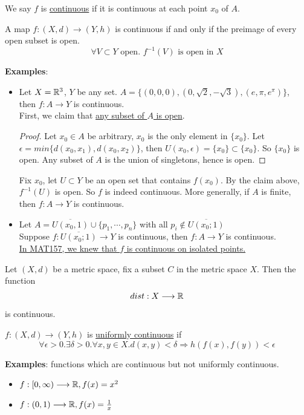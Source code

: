 \begin{definition}
    We say $f$ is \underline{continuous} if it is continuous at each point $x_0$ of $A$.
\end{definition}

\begin{theorem}
    A map $f:(X,d) \longrightarrow (Y,h)$ is continuous if and only if the preimage of every open subset is open.
    $$\forall V \subset Y \text{ open. } f^{-1}(V) \text{ is open in }X$$
\end{theorem}


\noindent \textbf{Examples}:
\begin{itemize}
    \item Let $X=\mathbb{R}^3$, $Y$ be any set. $A=\{(0,0,0),(0,\sqrt{2},-\sqrt{3}),(e,\pi,e^{\pi})\}$,\\ then $f:A \longrightarrow Y$ is continuous.\\
    First, we claim that \underline{any subset of $A$ is open}.
    \begin{proof}
        Let $x_0 \in A$ be arbitrary, $x_0$ is the only element in $\{x_0\}$. 
        Let $\epsilon=min\{d(x_0,x_1),d(x_0,x_2)\}$, then $U(x_0,\epsilon)=\{x_0\} \subset \{x_0\}$. 
        So $\{x_0\}$ is open. Any subset of $A$ is the union of singletons, hence is open.
    \end{proof}
    Fix $x_0$, let $U \subset Y$ be an open set that contains $f(x_0)$. 
    By the claim above, $f^{-1}(U)$ is open. So $f$ is indeed continuous. 
    More generally, if $A$ is finite, then $f:A \longrightarrow Y$ is continuous.
    \item Let $A=\overline{U(x_0,1)}\cup \{p_1,\cdots,p_n\}$ with all $p_i \notin \overline{U(x_0;1)}$\\
    Suppose $f:\overline{U(x_0;1)} \longrightarrow Y$ is continuous, then $f:A \longrightarrow Y$ is continuous.\\
    \underline{In MAT157, we knew that $f$ is continuous on isolated points.}
\end{itemize}

\begin{theorem} \label{dist continuous}
    Let $(X,d)$ be a metric space, fix a subset $C$ in the metric space $X$.
    Then the function $$dist:X \longrightarrow \mathbb{R}$$ is continuous.
\end{theorem}

\begin{definition}
    $f:(X,d) \longrightarrow (Y,h)$ is \underline{uniformly continuous} if 
    $$\forall \epsilon >0. \exists \delta >0. \forall x,y \in X.d(x,y)<\delta \Longrightarrow h(f(x),f(y))<\epsilon$$
\end{definition}
\noindent \textbf{Examples}: functions which are continuous but not uniformly continuous.
\begin{itemize}
    \item $f:[0,\infty) \longrightarrow \mathbb{R},f(x)=x^2$
    \item $f:(0,1) \longrightarrow \mathbb{R},f(x)=\frac{1}{x}$
\end{itemize}

